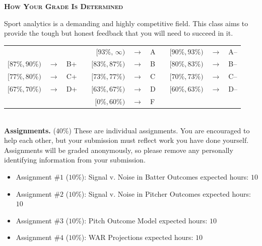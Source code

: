 \documentclass[11pt]{article}
\begin{document}
\newpage
\textbf{\textsc{How Your Grade Is Determined}}
\begin{adjustwidth}{1cm}{0cm}
	Sport analytics is a demanding and highly competitive field. This class aims to provide the tough but honest feedback that you will need to succeed in it.
  \begin{center}
    \begin{tabular}{rclcrclcrcl}
                      &               &     & & $[93\%,\,\infty)$ & $\rightarrow$ & A & & $[90\%, 93\%)$ & $\rightarrow$	& A--\\
      $[87\%, 90\%)$  & $\rightarrow$	& B+  & & $[83\%, 87\%)$  & $\rightarrow$ & B & & $[80\%, 83\%)$ & $\rightarrow$	& B--\\
      $[77\%, 80\%)$  & $\rightarrow$	& C+  & & $[73\%, 77\%)$  & $\rightarrow$ & C & & $[70\%, 73\%)$ & $\rightarrow$	& C--\\
      $[67\%, 70\%)$  & $\rightarrow$	& D+  & & $[63\%, 67\%)$  & $\rightarrow$ & D & & $[60\%, 63\%)$ & $\rightarrow$  & D--\\
                      &               &     & & $[ 0\%, 60\%)$  & $\rightarrow$ & F\\
    \end{tabular}
  \end{center}
  ~\\
	\textbf{Assignments.} ($40\%$) These are individual assignments. You are encouraged to help each other, but your submission must reflect work you have done yourself. Assignments will be graded anonymously, so please remove any personally identifying information from your submission.
  \begin{itemize}
    \item Assignment \#$1$ ($10\%$): Signal v. Noise in Batter Outcomes   \hfill  expected hours: $10$
    \item Assignment \#$2$ ($10\%$): Signal v. Noise in Pitcher Outcomes  \hfill  expected hours: $10$
    \item Assignment \#$3$ ($10\%$): Pitch Outcome Model                  \hfill  expected hours: $10$
    \item Assignment \#$4$ ($10\%$): WAR Projections                      \hfill  expected hours: $10$
  \end{itemize}


\end{adjustwidth}
\end{document}
